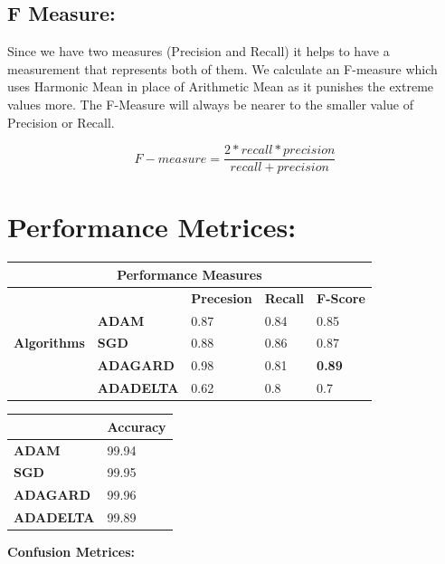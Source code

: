 \documentclass{report}
\begin{document}
\subsection{F Measure: }
Since we have two measures (Precision and Recall) it helps to have a measurement that represents both of them. We calculate an F-measure which uses Harmonic Mean in place of Arithmetic Mean as it punishes the extreme values more.
The F-Measure will always be nearer to the smaller value of Precision or Recall.

\[F-measure = \frac{2 * recall * precision}{recall + precision}\]



\section{Performance Metrices: }
\begin{table}[htbp]
\begin{tabular}{|l|l|l|l|l|}
\hline
\multicolumn{5}{|c|}{\textbf{Performance Measures}} \\ \hline
\multirow{5}{*}{\textbf{Algorithms}} & \textbf{} & \textbf{Precesion} & \textbf{Recall} & \textbf{F-Score} \\ \cline{2-5} 
 & \textbf{ADAM} & 0.87 & 0.84 & 0.85 \\ \cline{2-5} 
 & \textbf{SGD} & 0.88 & 0.86 & 0.87 \\ \cline{2-5} 
 & \textbf{ADAGARD} & 0.98 & 0.81 & \textbf{0.89} \\ \cline{2-5} 
 & \textbf{ADADELTA} & 0.62 & 0.8 & 0.7 \\ \hline
\end{tabular}
\end{table}


\begin{table}[htbp]
\begin{tabular}{|l|l|}
\hline
 & \textbf{Accuracy} \\ \hline
\textbf{ADAM} & 99.94 \\ \hline
\textbf{SGD} & 99.95 \\ \hline
\textbf{ADAGARD} & 99.96 \\ \hline
\textbf{ADADELTA} & 99.89 \\ \hline
\end{tabular}
\end{table}

\textbf{Confusion Metrices: }
\end{document}

